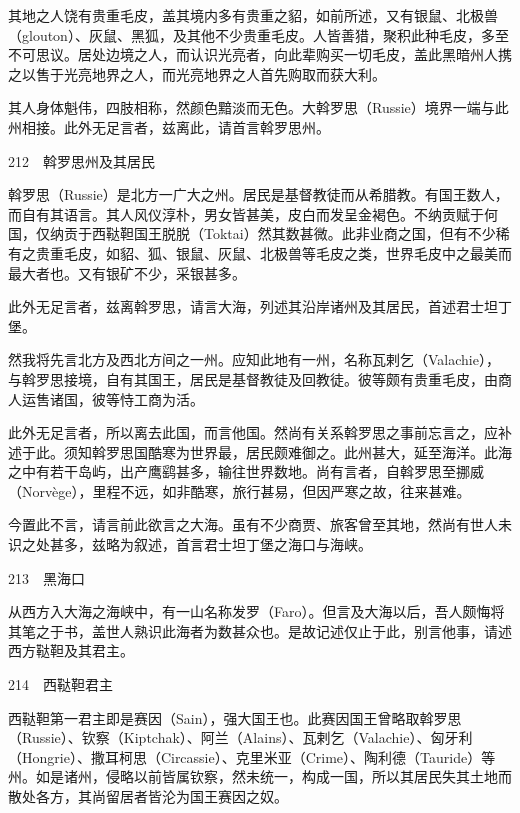 \documentclass[12pt,UTF8]{ctexbook}
\begin{document}
其地之人饶有贵重毛皮，盖其境内多有贵重之貂，如前所述，又有银鼠、北极兽（glouton）、灰鼠、黑狐，及其他不少贵重毛皮。人皆善猎，聚积此种毛皮，多至不可思议。居处边境之人，而认识光亮者，向此辈购买一切毛皮，盖此黑暗州人携之以售于光亮地界之人，而光亮地界之人首先购取而获大利。

其人身体魁伟，四肢相称，然颜色黯淡而无色。大斡罗思（Russie）境界一端与此州相接。此外无足言者，兹离此，请首言斡罗思州。





212　斡罗思州及其居民

斡罗思（Russie）是北方一广大之州。居民是基督教徒而从希腊教。有国王数人，而自有其语言。其人风仪淳朴，男女皆甚美，皮白而发呈金褐色。不纳贡赋于何国，仅纳贡于西鞑靼国王脱脱（Toktai）然其数甚微。此非业商之国，但有不少稀有之贵重毛皮，如貂、狐、银鼠、灰鼠、北极兽等毛皮之类，世界毛皮中之最美而最大者也。又有银矿不少，采银甚多。

此外无足言者，兹离斡罗思，请言大海，列述其沿岸诸州及其居民，首述君士坦丁堡。

然我将先言北方及西北方间之一州。应知此地有一州，名称瓦剌乞（Valachie），与斡罗思接境，自有其国王，居民是基督教徒及回教徒。彼等颇有贵重毛皮，由商人运售诸国，彼等恃工商为活。

此外无足言者，所以离去此国，而言他国。然尚有关系斡罗思之事前忘言之，应补述于此。须知斡罗思国酷寒为世界最，居民颇难御之。此州甚大，延至海洋。此海之中有若干岛屿，出产鹰鹞甚多，输往世界数地。尚有言者，自斡罗思至挪威（Norvège），里程不远，如非酷寒，旅行甚易，但因严寒之故，往来甚难。

今置此不言，请言前此欲言之大海。虽有不少商贾、旅客曾至其地，然尚有世人未识之处甚多，兹略为叙述，首言君士坦丁堡之海口与海峡。





213　黑海口

从西方入大海之海峡中，有一山名称发罗（Faro）。但言及大海以后，吾人颇悔将其笔之于书，盖世人熟识此海者为数甚众也。是故记述仅止于此，别言他事，请述西方鞑靼及其君主。





214　西鞑靼君主

西鞑靼第一君主即是赛因（Sain），强大国王也。此赛因国王曾略取斡罗思（Russie）、钦察（Kiptchak）、阿兰（Alains）、瓦剌乞（Valachie）、匈牙利（Hongrie）、撒耳柯思（Circassie）、克里米亚（Crime）、陶利德（Tauride）等州。如是诸州，侵略以前皆属钦察，然未统一，构成一国，所以其居民失其土地而散处各方，其尚留居者皆沦为国王赛因之奴。
\end{document}
